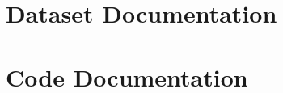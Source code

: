 \appendix
\chapter{Dataset Documentation}
\label{app:dataset}
\chapter{Code Documentation} 
\label{app:code}
\newpage
